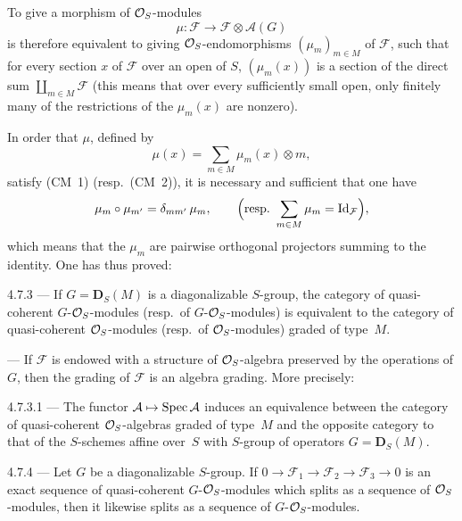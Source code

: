 To give a morphism of \(\mathcal{O}_S\)-modules
\[
\mu \colon \mathcal{F} \longrightarrow \mathcal{F} \otimes \mathcal{A}(G)
\]
is therefore equivalent to giving \(\mathcal{O}_S\)-endomorphisms
\((\mu_{m})_{m \in M}\) of \(\mathcal{F}\), such that for every section \(x\)
of \(\mathcal{F}\) over an open of \(S\), \((\mu_{m}(x))\) is a section of the
direct sum \(\coprod_{m \in M} \mathcal{F}\) (this means that over every
sufficiently small open, only finitely many of the restrictions of the
\(\mu_{m}(x)\) are nonzero).

In order that \(\mu\), defined by
\[
\mu(x) = \sum_{m \in M} \mu_{m}(x) \otimes m,
\]
satisfy (CM~1) (resp.\ (CM~2)), it is necessary and sufficient that one have
\[
\mu_{m} \circ \mu_{m'} = \delta_{mm'}\,\mu_{m},
\qquad
\Bigl(\text{resp.}\ \sum_{m \in M} \mu_{m} = \mathrm{Id}_{\mathcal{F}}\Bigr),
\]
which means that the \(\mu_{m}\) are pairwise orthogonal projectors summing to
the identity. One has thus proved:

\begin{proposition}{4.7.3}\label{I.4.7.3}
--- If \(G = \mathbf{D}_{S}(M)\) is a diagonalizable \(S\)-group, the category of
quasi-coherent \(G\)-\(\mathcal{O}_S\)-modules
(resp.\ of \(G\)-\(\mathcal{O}_S\)-modules) is equivalent to the category of
quasi-coherent \(\mathcal{O}_S\)-modules (resp.\ of \(\mathcal{O}_S\)-modules) graded of type~\(M\).
\end{proposition}

\begin{remark*}
--- If \(\mathcal{F}\) is endowed with a structure of \(\mathcal{O}_S\)-algebra preserved by
the operations of \(G\), then the grading of \(\mathcal{F}\) is an algebra
grading. More precisely:
\end{remark*}

\begin{corollary}{4.7.3.1}\label{I.4.7.3.1}
--- The functor \(\mathcal{A} \mapsto \operatorname{Spec} \mathcal{A}\) induces an equivalence
between the category of quasi-coherent \(\mathcal{O}_S\)-algebras graded of type~\(M\)
and the opposite category to that of the \(S\)-schemes affine over~\(S\) with
\(S\)-group of operators \(G = \mathbf{D}_{S}(M)\).
\end{corollary}

\begin{proposition}{4.7.4}\label{I.4.7.4}
--- Let \(G\) be a diagonalizable \(S\)-group. If
\(0 \to \mathcal{F}_{1} \to \mathcal{F}_{2} \to \mathcal{F}_{3} \to 0\)
is an exact sequence of quasi-coherent \(G\)-\(\mathcal{O}_S\)-modules which
splits as a sequence of \(\mathcal{O}_S\)-modules, then it likewise splits as a sequence
of \(G\)-\(\mathcal{O}_S\)-modules.
\end{proposition}

